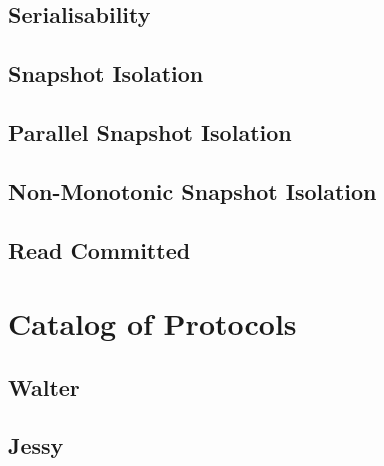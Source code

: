 \subsection{Serialisability}
\subsection{Snapshot Isolation}
\subsection{Parallel Snapshot Isolation}
\subsection{Non-Monotonic Snapshot Isolation}
\subsection{Read Committed}

\section{Catalog of Protocols}
\subsection{Walter}
\subsection{Jessy}
